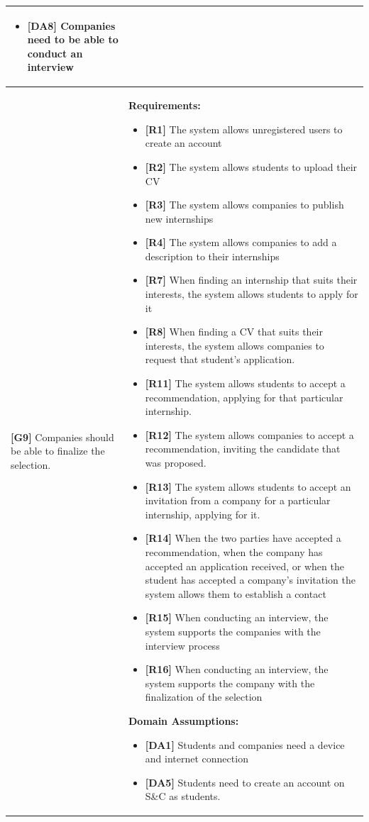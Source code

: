 \begin{longtable}{|p{}|p{}|}
\begin{itemize}
    \item \textbf{[DA8]} Companies need to be able to conduct an interview
\end{itemize} \\
\hline
\textbf{[G9]} Companies should be able to finalize the selection. 
& 
\textbf{Requirements:}
\begin{itemize}
    \item \textbf{[R1]} The system allows unregistered users to create an account
    \item \textbf{[R2]} The system allows students to upload their CV
    \item \textbf{[R3]} The system allows companies to publish new internships
    \item \textbf{[R4]} The system allows companies to add a description to their internships
    \item \textbf{[R7]} When finding an internship that suits their interests, the system allows students to apply for it
    \item \textbf{[R8]} When finding a CV that suits their interests, the system allows companies to request that student's application.
    \item  \textbf{[R11]} The system allows students to accept a recommendation, applying for that particular internship.
    \item  \textbf{[R12]} The system allows companies to accept a recommendation, inviting the candidate that was proposed.
    \item \textbf{[R13]} The system allows students to accept an invitation from a company for a particular internship, applying for it.
    \item \textbf{[R14]} When the two parties have accepted a recommendation, when the company has accepted an application received, or when the student has accepted a company's invitation the system allows them to establish a contact
    \item \textbf{[R15]} When conducting an interview, the system supports the companies with the interview process
    \item \textbf{[R16]} When conducting an interview, the system supports the company with the finalization of the selection
\end{itemize}
\textbf{Domain Assumptions:}
\begin{itemize}
    \item \textbf{[DA1]} Students and companies need a device and internet connection
    \item \textbf{[DA5]} Students need to create an account on S\&C as students.

\end{itemize}
\end{longtable}
